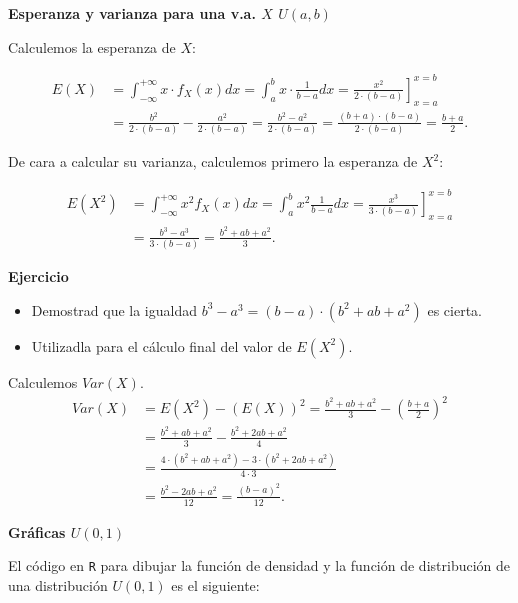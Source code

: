 \documentclass[
  letterpaper,
  DIV=11,
  numbers=noendperiod]{scrreprt}
\begin{document}
\textbf{Esperanza y varianza para una v.a. \(X\) \(U(a,b)\)}

Calculemos la esperanza de \(X\):

\[
\begin{array}{rl}
E(X)&=\displaystyle\int_{-\infty}^{+\infty} x\cdot f_X(x) dx =\int_{a}^{b} x \cdot \frac{1}{b-a} dx =
\left.\frac{x^2}{2\cdot (b-a)}\right]_{x=a}^{x=b}\\
&=\displaystyle \frac{b^2}{2\cdot (b-a)}-\frac{a^2}{2\cdot (b-a)}=
\frac{b^2-a^2}{2\cdot (b-a)}=\frac{(b+a)\cdot (b-a)}{2\cdot (b-a)}=
\frac{b+a}{2}.
\end{array}
\]

De cara a calcular su varianza, calculemos primero la esperanza de
\(X^2\):

\[
\begin{array}{rl}
E(X^2)&=\displaystyle\int_{-\infty}^{+\infty} x^2 f_X(x) dx=\int_{a}^{b} x^2 \frac1{b-a}
dx =\left.\frac{x^3}{3\cdot (b-a)}\right]_{x=a}^{x=b} \\
&=\displaystyle\frac{b^3-a^3}{3\cdot (b-a)}=\frac{b^2+ab+a^2}{3}.
\end{array}
\]

\textbf{Ejercicio}

\begin{itemize}
\item
  Demostrad que la igualdad \(b^3-a^3=(b-a)\cdot (b^2+ab+a^2)\) es
  cierta.
\item
  Utilizadla para el cálculo final del valor de \(E(X^2)\).
\end{itemize}

Calculemos \(Var(X)\). \[
\begin{array}{rl}
Var(X)&=\displaystyle E(X^2)-(E(X))^2=\frac{b^2+ab+a^2}3-\left(\frac{b+a}2\right)^2\\&=\displaystyle
\frac{b^2+ab+a^2}{3}-\frac{b^2+2ab+a^2}{4}\\
&=\displaystyle
\frac{4\cdot (b^2+ab+a^2)-3\cdot (b^2+2ab+a^2)}{4\cdot 3}
\\
&=\displaystyle
\frac{b^2-2ab+a^2}{12}=
\frac{(b-a)^2}{12}.
\end{array}
\]

\textbf{Gráficas \(U(0,1)\)}

El código en \texttt{R} para dibujar la función de densidad y la función
de distribución de una distribución \(U(0,1)\) es el siguiente:
\end{document}
